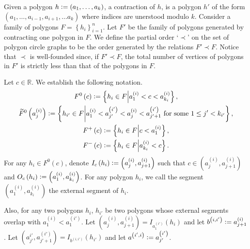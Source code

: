 \documentclass[12pt]{article}
\theoremstyle{definition}
\newcommand{\defeq}{\vcentcolon=}
\begin{document}
     Given a polygon
     $h \defeq \left(
     a_{1}, \ldots, a_{k}\right)$,
     a contraction of $h$,
     is a polygon $h'$ 
     of the form
     $\left(a_{1}, \ldots,
     a_{i-1}, a_{i+1}, \ldots
     a_{k}\right)$ 
     where indices are
     unerstood modulo $k$.
     Consider a family of
     polygons
     $F = \left\{h_{i}\right\}_{i=1}^{n}$.
     Let $F'$ be the family
     of polygons generated
     by contracting one
     polygon in $F$.
     We define the partial order
     `$\prec$' on the set
     of polygon circle graphs
     to be the order generated
     by the relations $F' \prec F$.
     Notice that $\prec$ is
     well-founded since,
     if $F' \prec F$,
     the total number of 
     vertices of polygons in
     $F'$ is strictly less than
     that of the polygons in $F$.

     Let $c \in \mathbb{R}$.
     We establish the following notation.
     \begin{gather*}
         F^{0}\left(c\right) \defeq
         \left\{h_{i} \in F \middle|
         a_{1}^{\left(i\right)}
         < c < a_{k_{i}}^{\left(i\right)}\right\}, \\
         \widetilde{F}^{0}\left(a_{j}^{\left(i\right)}\right)
         \defeq \left\{
         h_{i'} \in F \middle|
         a_{1}^{\left(i\right)} < a_{j'}^{\left(i'\right)}
         < a_{j}^{\left(i\right)}
         < a_{j'+1}^{\left(i'\right)}
         \text{ for some }
         1 \leq j' < k_{i'} \right\},\\
         F^{+}\left(c\right) \defeq
         \left\{h_{i} \in F \middle|
         c < a_{1}^{\left(i\right)}\right\},\\
         F^{-}\left(c\right) \defeq
         \left\{h_{i} \in F
         \middle| a_{k_{i}}^{\left(i\right)} < c\right\}.
     \end{gather*}
     For any $h_{i} \in F^{0}\left(c\right)$,
     denote $I_{c}\left(h_{i}\right)
     \defeq \left(a_{j}^{\left(i\right)},
     a_{j+1}^{\left(i\right)}\right)$ 
     such that $c \in 
     \left(a_{j}^{\left(i\right)},
     a_{j+1}^{\left(i\right)}\right)$ 
     and $O_{c}\left(h_{i}\right)
     \defeq \left(a_{1}^{\left(i\right)},
     a_{k_{i}}^{\left(i\right)}\right)$.
     For any polygon $h_{i}$,
     we call the segment
     $\left(a_{1}^{\left(i\right)},
     a_{k_{i}}^{\left(i\right)}\right)$
     the external
     segment of $h_{i}$.

     Also, for any two polygons
     $h_{i}$, $h_{i'}$ be two
     polygons whose external segments
     overlap with
     $a_1^{\left(i\right)} < a_1^{\left(i'\right)}$.
     Let $\left(a_{j}^{\left(i\right)},
     a_{j+1}^{\left(i\right)}\right) =
     I_{a_1^{\left(i'\right)}}\left(h_{i}\right)$
     and let
     $b^{\left(i, i'\right)} \defeq a_{j+1}^{\left(i\right)}$.
     Let $\left(a_{j'}^{i'}, a_{j'+1}^{\left(i'\right)}\right)
     = I_{b^{\left(i,i'\right)}}\left(h_{i'}\right)$ 
     and let $a^{\left(i',i\right)}
     \defeq a_{j'}^{\left(i'\right)}$.
\end{document}
